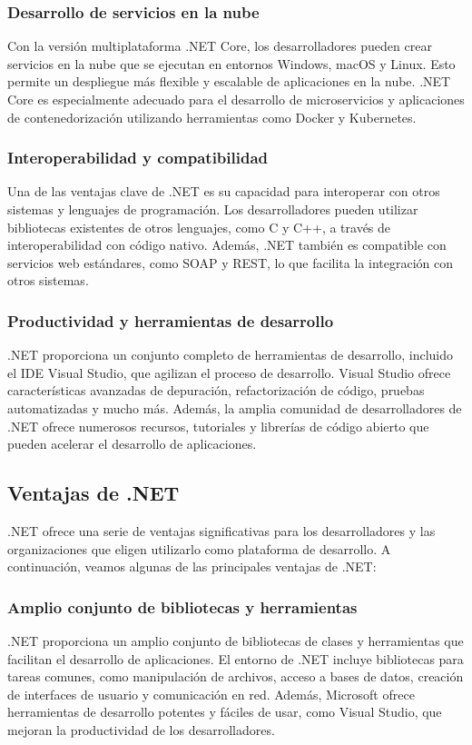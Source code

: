 \documentclass[executivepaper]{article}
\begin{document}
\subsubsection*{Desarrollo de servicios en la nube}
Con la versión multiplataforma .NET Core, los desarrolladores pueden crear servicios en la nube que se ejecutan en entornos Windows, macOS y Linux. Esto permite un despliegue más flexible y escalable de aplicaciones en la nube. .NET Core es especialmente adecuado para el desarrollo de microservicios y aplicaciones de contenedorización utilizando herramientas como Docker y Kubernetes.

\subsubsection*{Interoperabilidad y compatibilidad}
Una de las ventajas clave de .NET es su capacidad para interoperar con otros sistemas y lenguajes de programación. Los desarrolladores pueden utilizar bibliotecas existentes de otros lenguajes, como C y C++, a través de interoperabilidad con código nativo. Además, .NET también es compatible con servicios web estándares, como SOAP y REST, lo que facilita la integración con otros sistemas.

\subsubsection*{Productividad y herramientas de desarrollo}
.NET proporciona un conjunto completo de herramientas de desarrollo, incluido el IDE Visual Studio, que agilizan el proceso de desarrollo. Visual Studio ofrece características avanzadas de depuración, refactorización de código, pruebas automatizadas y mucho más. Además, la amplia comunidad de desarrolladores de .NET ofrece numerosos recursos, tutoriales y librerías de código abierto que pueden acelerar el desarrollo de aplicaciones.

\subsection{Ventajas de .NET}

.NET ofrece una serie de ventajas significativas para los desarrolladores y las organizaciones que eligen utilizarlo como plataforma de desarrollo. A continuación, veamos algunas de las principales ventajas de .NET:

\subsubsection*{Amplio conjunto de bibliotecas y herramientas}
.NET proporciona un amplio conjunto de bibliotecas de clases y herramientas que facilitan el desarrollo de aplicaciones. El entorno de .NET incluye bibliotecas para tareas comunes, como manipulación de archivos, acceso a bases de datos, creación de interfaces de usuario y comunicación en red. Además, Microsoft ofrece herramientas de desarrollo potentes y fáciles de usar, como Visual Studio, que mejoran la productividad de los desarrolladores.
\end{document}
